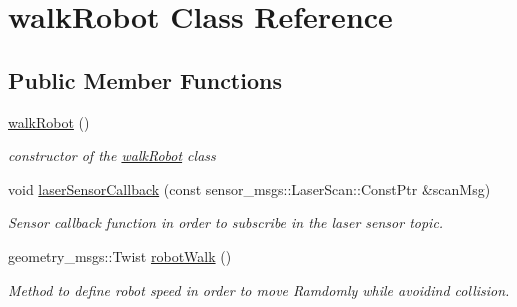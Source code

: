 \hypertarget{classwalkRobot}{}\section{walk\+Robot Class Reference}
\label{classwalkRobot}
\subsection*{Public Member Functions}
\begin{DoxyCompactItemize}
\item 
\hyperlink{classwalkRobot_a1fa0365ac086c66276b1624a0f2a1da1}{walk\+Robot} ()
\begin{DoxyCompactList}\small\item\em constructor of the \hyperlink{classwalkRobot}{walk\+Robot} class \end{DoxyCompactList}\item 
void \hyperlink{classwalkRobot_a9c9fca551eaf03f0e88fff9b06c41a5b}{laser\+Sensor\+Callback} (const sensor\+\_\+msgs\+::\+Laser\+Scan\+::\+Const\+Ptr \&scan\+Msg)
\begin{DoxyCompactList}\small\item\em Sensor callback function in order to subscribe in the laser sensor topic. \end{DoxyCompactList}\item 
geometry\+\_\+msgs\+::\+Twist \hyperlink{classwalkRobot_a004b0b6a1dc1946d645aa260dfa3ad5c}{robot\+Walk} ()
\begin{DoxyCompactList}\small\item\em Method to define robot speed in order to move Ramdomly while avoidind collision. \end{DoxyCompactList}\end{DoxyCompactItemize}
